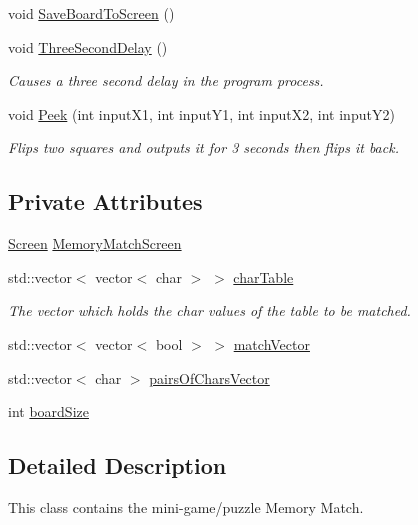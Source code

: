 \begin{DoxyCompactItemize}
void \hyperlink{classMemoryMatch_a6d4c54b56ee4f5b4df36b7767e07ebd5}{Save\-Board\-To\-Screen} ()
\item 
void \hyperlink{classMemoryMatch_a698d59d1b34658bc2266bfe297623690}{Three\-Second\-Delay} ()
\begin{DoxyCompactList}\small\item\em Causes a three second delay in the program process. \end{DoxyCompactList}\item 
void \hyperlink{classMemoryMatch_ae78665422f8d46d0c4639916f494845c}{Peek} (int input\-X1, int input\-Y1, int input\-X2, int input\-Y2)
\begin{DoxyCompactList}\small\item\em Flips two squares and outputs it for 3 seconds then flips it back. \end{DoxyCompactList}\end{DoxyCompactItemize}
\subsection*{Private Attributes}
\begin{DoxyCompactItemize}
\item 
\hyperlink{classScreen}{Screen} \hyperlink{classMemoryMatch_a78399975fec5fea7b2102449a4536fcd}{Memory\-Match\-Screen}
\item 
std\-::vector$<$ vector$<$ char $>$ $>$ \hyperlink{classMemoryMatch_af2437cf6ce06147e64feb7dca23715e7}{char\-Table}
\begin{DoxyCompactList}\small\item\em The vector which holds the char values of the table to be matched. \end{DoxyCompactList}\item 
std\-::vector$<$ vector$<$ bool $>$ $>$ \hyperlink{classMemoryMatch_ac42fc8b5ac8b04bd0651222fa31d2251}{match\-Vector}
\item 
std\-::vector$<$ char $>$ \hyperlink{classMemoryMatch_a80336b0b989152fed590a6fa755197bc}{pairs\-Of\-Chars\-Vector}
\item 
int \hyperlink{classMemoryMatch_aae0a9e51558d70e671fa64aa246de499}{board\-Size}
\end{DoxyCompactItemize}


\subsection{Detailed Description}
This class contains the mini-\/game/puzzle Memory Match. 

